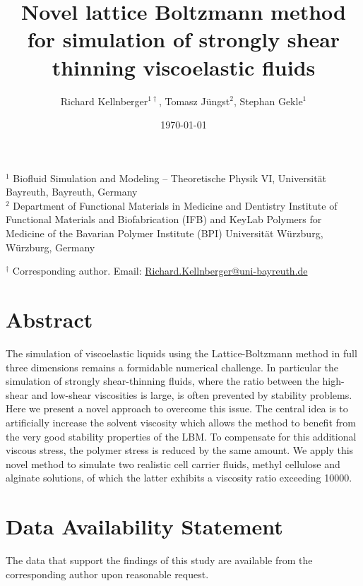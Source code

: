 \documentclass[a4paper,12pt]{scrartcl}
\title{Novel lattice Boltzmann method for simulation of strongly shear thinning viscoelastic fluids}
\author{Richard Kellnberger$^{1\dagger}$\orcidlink{0009-0003-1782-4735}, Tomasz Jüngst$^2$, Stephan Gekle$^1$\orcidlink{0000-0001-5597-1160}}
\date{\today}
\begin{document}
	\maketitle

	\begin{center}
		$^1$ Biofluid Simulation and Modeling – Theoretische Physik VI, Universität Bayreuth, Bayreuth, Germany\\
		$^2$ Department of Functional Materials in Medicine and Dentistry Institute of Functional Materials and Biofabrication (IFB) and KeyLab Polymers for Medicine of the Bavarian Polymer Institute (BPI) Universität Würzburg, Würzburg, Germany
	\end{center}
	\begin{center}
		$^\dagger$ Corresponding author. Email: \href{mailto:Richard.Kellnberger@uni-bayreuth.de}{Richard.Kellnberger@uni-bayreuth.de}
	\end{center}
	\vspace{\fill}

	\newpage
	\null
	\newpage


	\newpage


\section*{Abstract}

The simulation of viscoelastic liquids using the Lattice-Boltzmann method in full three dimensions remains a formidable numerical challenge.
In particular the simulation of strongly shear-thinning fluids, where the ratio between the high-shear and low-shear viscosities is large, is often prevented by stability problems.
Here we present a novel approach to overcome this issue.
The central idea is to artificially increase the solvent viscosity which allows the method to benefit from the very good stability properties of the LBM.
To compensate for this additional viscous stress, the polymer stress is reduced by the same amount.
We apply this novel method to simulate two realistic cell carrier fluids, methyl cellulose and alginate solutions, of which the latter exhibits a viscosity ratio exceeding \num{10000}.

\section*{Data Availability Statement}
The data that support the findings of this study are available from the corresponding author upon reasonable request.
\end{document}
